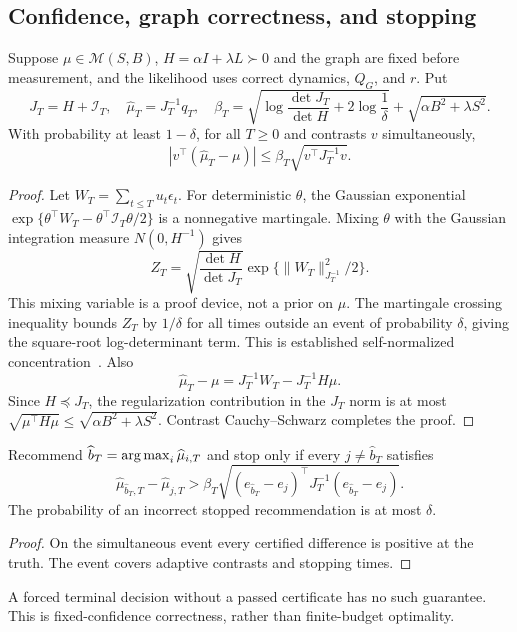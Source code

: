 \subsection{Confidence, graph correctness, and stopping}
\begin{theorem}
Suppose $\mu\in\mathcal M(S,B)$, $H=\alpha I+\lambda L\succ0$ and the graph are fixed before measurement, and the likelihood uses correct dynamics, $Q_G$, and $r$. Put
\begin{equation}
J_T=H+\mathcal I_T,\quad\widehat\mu_T=J_T^{-1}q_T,\quad
\beta_T=\sqrt{\log\frac{\det J_T}{\det H}+2\log\frac1\delta}
+\sqrt{\alpha B^2+\lambda S^2}.
\label{spatiotemporal_bandits:eq:beta}
\end{equation}
With probability at least $1-\delta$, for all $T\ge0$ and contrasts $v$ simultaneously,
\begin{equation}
\boxed{|v^\top(\widehat\mu_T-\mu)|\le\beta_T\sqrt{v^\top J_T^{-1}v}.}
\label{spatiotemporal_bandits:eq:confidence}
\end{equation}
\end{theorem}
\begin{proof}
Let $W_T=\sum_{t\le T}u_t\epsilon_t$. For deterministic $\theta$, the Gaussian exponential
$\exp\{\theta^\top W_T-\theta^\top\mathcal I_T\theta/2\}$ is a nonnegative martingale. Mixing $\theta$ with the Gaussian integration measure $N(0,H^{-1})$ gives
\[
Z_T=\sqrt{\frac{\det H}{\det J_T}}\exp\{\|W_T\|_{J_T^{-1}}^2/2\}.
\]
This mixing variable is a proof device, not a prior on $\mu$. The martingale crossing inequality bounds $Z_T$ by $1/\delta$ for all times outside an event of probability $\delta$, giving the square-root log-determinant term. This is established self-normalized concentration~\cite{collected7}. Also
\[
\widehat\mu_T-\mu=J_T^{-1}W_T-J_T^{-1}H\mu.
\]
Since $H\preceq J_T$, the regularization contribution in the $J_T$ norm is at most $\sqrt{\mu^\top H\mu}\le\sqrt{\alpha B^2+\lambda S^2}$. Contrast Cauchy--Schwarz completes the proof.
\end{proof}

\begin{corollary}
Recommend $\widehat b_T=\operatorname*{arg\,max}_i\widehat\mu_{i,T}$ and stop only if every $j\ne\widehat b_T$ satisfies
\begin{equation}
\widehat\mu_{\widehat b_T,T}-\widehat\mu_{j,T}>
\beta_T\sqrt{(e_{\widehat b_T}-e_j)^\top J_T^{-1}(e_{\widehat b_T}-e_j)}.
\label{spatiotemporal_bandits:eq:stopping}
\end{equation}
The probability of an incorrect stopped recommendation is at most $\delta$.
\end{corollary}
\begin{proof}
On the simultaneous event every certified difference is positive at the truth. The event covers adaptive contrasts and stopping times.
\end{proof}
A forced terminal decision without a passed certificate has no such guarantee. This is fixed-confidence correctness, rather than finite-budget optimality.

